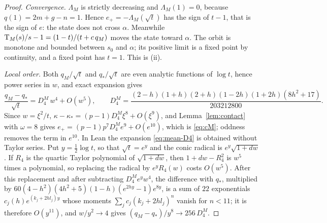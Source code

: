 \begin{proof}
\emph{Convergence.} $\Lambda_M$ is strictly decreasing and $\Lambda_M(1)=0$, because
$q(1)=2m+g-n=1$. Hence $e_+=-\Lambda_M(\sqrt t)$ has the sign of $t-1$, that is the sign of $e$: the
state does not cross $\alpha$. Meanwhile $\mathrm{T}_M(s)/s-1=(1-t)/(t+c\,q_M)$ moves the state toward
$\alpha$. The orbit is monotone and bounded between $s_0$ and $\alpha$; its positive limit is a fixed
point by continuity, and a fixed point has $t=1$. This is (ii).

\emph{Local order.} Both $q_M/\sqrt t$ and $q_*/\sqrt t$ are even analytic functions of $\log t$, hence
power series in $w$, and exact expansion gives
\begin{equation}\label{eq:mean-D4}
\frac{q_M-q_*}{\sqrt t}=D_4^{M}\,w^{4}+O(w^{5}),\qquad
D_4^{M}=\frac{(2-h)(1+h)(2+h)(1-2h)(1+2h)(8h^{2}+17)}{203212800} .
\end{equation}
Since $w=\xi^{2}/t$, $\kappa-\kappa_*=(p-1)D_4^{M}\xi^{8}+O(\xi^{9})$, and Lemma~\ref{lem:contact} with
$\omega=8$ gives $e_+=(p-1)p^{7}D_4^{M}e^{9}+O(e^{10})$, which is \eqref{eq:cM}; oddness removes the
term in $e^{10}$. In Lean the expansion \eqref{eq:mean-D4} is obtained without Taylor series. Put
$y=\tfrac12\log t$, so that $\sqrt t=e^{y}$ and the conic radical is $e^{y}\sqrt{1+dw}$. If $R_4$ is the
quartic Taylor polynomial of $\sqrt{1+dw}$, then $1+dw-R_4^{2}$ is $w^{5}$ times a polynomial, so
replacing the radical by $e^{y}R_4(w)$ costs $O(w^{5})$. After this replacement and after subtracting
$D_4^{M}e^{y}w^{4}$, the difference with $q_*$, multiplied by
$60(4-h^{2})(4h^{2}+5)(1-h)(e^{2hy}-1)e^{8y}$, is a sum of $22$ exponentials $c_j(h)e^{(k_j+2hl_j)y}$
whose moments $\sum_jc_j(k_j+2hl_j)^{n}$ vanish for $n<11$; it is therefore $O(y^{11})$, and
$w/y^{2}\to4$ gives $(q_M-q_*)/y^{8}\to256\,D_4^{M}$.
\end{proof}

